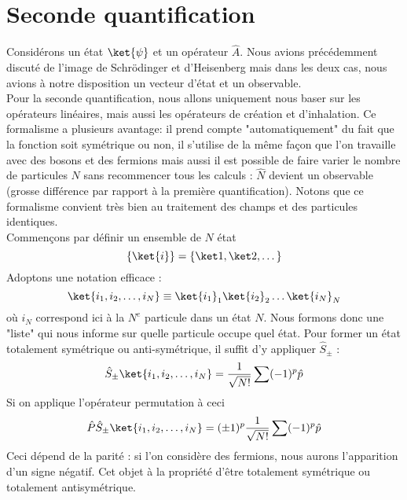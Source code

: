 \chapter{Seconde quantification}
Considérons un état $\ket{\psi}$ et un opérateur $\hat{A}$. Nous avions précédemment discuté de l'image
de Schrödinger et d'Heisenberg mais dans les deux cas, nous avions à notre disposition un vecteur d'état 
et un observable.\\

Pour la seconde quantification, nous allons uniquement nous baser sur  les opérateurs linéaires, mais aussi 
les opérateurs de création et d'inhalation. Ce formalisme a plusieurs avantage: il prend compte 
"automatiquement" du fait que la fonction soit symétrique ou non, il s'utilise de la même façon que 
l'on travaille avec des bosons et des fermions mais aussi il est possible de faire varier le nombre 
de particules $N$ sans recommencer tous les calculs : $\hat{N}$ devient un observable (grosse différence 
par rapport à la première quantification). Notons que ce formalisme convient très bien au traitement 
des champs et des particules identiques.\\

Commençons par définir un ensemble de $N$ état
\begin{equation}
\{\ket{i}\} = \{\ket 1,\ket 2,\dots\}
\end{equation}
Adoptons une notation efficace :
\begin{equation}
\ket{i_1, i_2,\dots,i_N} \equiv \ket{i_1}_1\ket{i_2}_2\dots\ket{i_N}_N
\end{equation}
où $i_N$ correspond ici à la $N^e$ particule dans un état $N$. Nous formons donc une "liste" qui nous 
informe sur quelle particule occupe quel état. Pour former un état totalement symétrique
ou anti-symétrique, il suffit d'y appliquer $\hat{S}_\pm$ :
\begin{equation}
\hat{S}_\pm \ket{i_1, i_2,\dots,i_N} = \dfrac{1}{\sqrt{N!}}\sum(-1)^p\hat{p}
\end{equation}
Si on applique l'opérateur permutation à ceci
\begin{equation}
\hat{P}\hat{S}_\pm \ket{i_1, i_2,\dots,i_N} = (\pm 1)^p\dfrac{1}{\sqrt{N!}}\sum(-1)^p\hat{p}
\end{equation}
Ceci dépend de la parité : si l'on considère des fermions, nous aurons l'apparition d'un signe négatif. Cet 
objet à la propriété d'être totalement symétrique ou totalement antisymétrique.\\

